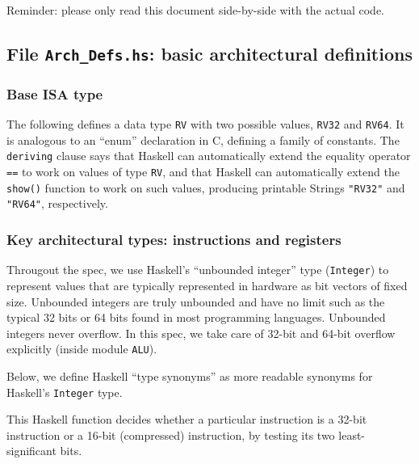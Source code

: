 \documentclass[11pt]{article}
\begin{document}
Reminder: please only read this document side-by-side with the actual code.


\subsection{File {\tt Arch\_Defs.hs}: basic architectural definitions}

\label{sec_arch_defs}


\subsubsection{Base ISA type}

The following defines a data type {\tt RV} with two possible values,
{\tt RV32} and {\tt RV64}.  It is analogous to an ``enum'' declaration
in C, defining a family of constants.  The {\tt deriving} clause says
that Haskell can automatically extend the equality operator {\tt ==}
to work on values of type {\tt RV}, and that Haskell can automatically
extend the {\tt show()} function to work on such values, producing
printable Strings {\tt "RV32"} and {\tt "RV64"}, respectively.




\subsubsection{Key architectural types: instructions and registers}

Througout the spec, we use Haskell's ``unbounded integer'' type
(\verb'Integer') to represent values that are typically represented in
hardware as bit vectors of fixed size.  Unbounded integers are truly
unbounded and have no limit such as the typical 32 bits or 64 bits
found in most programming languages.  Unbounded integers never
overflow. In this spec, we take care of 32-bit and 64-bit overflow
explicitly (inside module \verb|ALU|).

Below, we define Haskell ``type synonyms'' as more readable synonyms
for Haskell's {\tt Integer} type.



This Haskell function decides whether a particular instruction is a
32-bit instruction or a 16-bit (compressed) instruction, by testing
its two least-significant bits.
\end{document}
